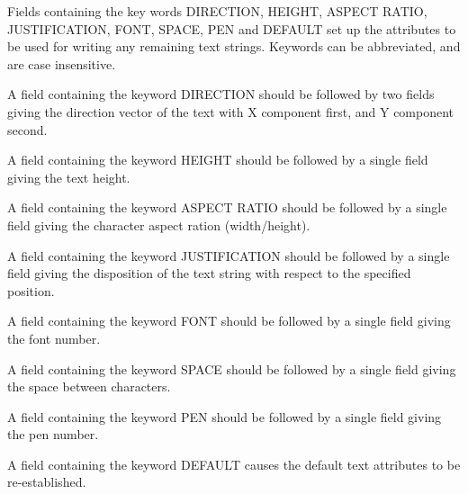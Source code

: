 \begin{small}
{{{{            \sstitem Fields containing the key words DIRECTION, HEIGHT, ASPECT
            RATIO, JUSTIFICATION, FONT, SPACE, PEN and DEFAULT set up the
            attributes to be used for writing any remaining text strings.
            Keywords can be abbreviated, and are case insensitive.

            \sstitem A field containing the keyword DIRECTION should be followed
            by two fields giving the direction vector of the text with X
            component first, and Y component second.

            \sstitem A field containing the keyword HEIGHT should be followed by
            a single field giving the text height.

            \sstitem A field containing the keyword ASPECT RATIO should be
            followed by a single field giving the character aspect ration
            (width/height).

            \sstitem A field containing the keyword JUSTIFICATION should be
            followed by a single field giving the disposition of the text
            string with respect to the specified position.

            \sstitem A field containing the keyword FONT should be followed by a
            single field giving the font number.

            \sstitem A field containing the keyword SPACE should be followed by a
            single field giving the space between characters.

            \sstitem A field containing the keyword PEN should be followed by a
            single field giving the pen number.

            \sstitem A field containing the keyword DEFAULT causes the default
            text attributes to be re-established.
         }
      }
   }
}

\end{small}
